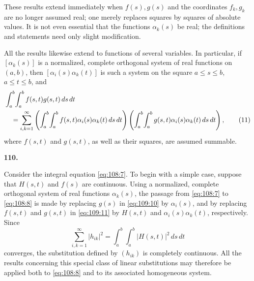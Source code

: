 \documentclass[
  paper=b5,
  fontsize=13pt,
  twoside=true,
  open=any,
  bookmarkpackage=false,
  chapterprefix=true,
  headings=normal
]{scrbook}
\theoremstyle{definition}
\newcommand{\numberedparagraph}[1]{%
  \par\medskip\phantomsection\label{sec:#1}%
  \noindent\textbf{#1.}\enspace
}
\begin{document}
These results extend immediately when \(f(s),g(s)\) and the coordinates
\(f_k,g_k\) are no longer assumed real; one merely replaces squares by
squares of absolute values.  It is not even essential that the functions
\(\alpha_k(s)\) be real; the definitions and statements need only slight
modification.

All the results likewise extend to functions of several variables.  In
particular, if \([\alpha_k(s)]\) is a normalized, complete orthogonal system of
real functions on \((a,b)\), then \([\alpha_i(s)\alpha_k(t)]\) is such a
system on the square \(a\le s\le b\), \(a\le t\le b\), and
\begin{align}
  &\int_a^b\!\int_a^b f(s,t)g(s,t)\,ds\,dt \notag\\
  &\quad=\sum_{i,k=1}^{\infty}
  \left(\int_a^b\!\int_a^b
  f(s,t)\alpha_i(s)\alpha_k(t)\,ds\,dt\right)
  \left(\int_a^b\!\int_a^b
  g(s,t)\alpha_i(s)\alpha_k(t)\,ds\,dt\right),
  \tag{11}\label{eq:109:11}
\end{align}
where \(f(s,t)\) and \(g(s,t)\), as well as their squares, are assumed
summable.

\numberedparagraph{110}
Consider the integral equation \eqref{eq:108:7}.  To begin with a simple
case, suppose that \(H(s,t)\) and \(f(s)\) are continuous.  Using a normalized,
complete orthogonal system of real functions \(\alpha_k(s)\), the passage from
\eqref{eq:108:7} to \eqref{eq:108:8} is made by replacing \(g(s)\) in
\eqref{eq:109:10} by \(\alpha_i(s)\), and by replacing \(f(s,t)\) and
\(g(s,t)\) in \eqref{eq:109:11} by \(H(s,t)\) and
\(\alpha_i(s)\alpha_k(t)\), respectively.  Since
\begin{equation}
  \sum_{i,k=1}^{\infty}|h_{ik}|^2
  =\int_a^b\!\int_a^b|H(s,t)|^2\,ds\,dt
  \tag{12}\label{eq:110:12}
\end{equation}
converges, the substitution defined by \((h_{ik})\) is completely continuous.
All the results concerning this special class of linear substitutions may
therefore be applied both to \eqref{eq:108:8} and to its associated
homogeneous system.
\end{document}

